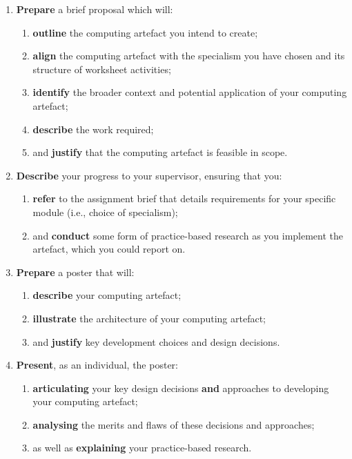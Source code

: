 \documentclass{../../fal_assignment}
\begin{document}
\begin{enumerate}[label=(\Alph*)]
	\item \textbf{Prepare} a brief proposal which will:
		\begin{enumerate}[label=(\roman*)]
			\item \textbf{outline} the computing artefact you intend to create;
			\item \textbf{align} the computing artefact with the specialism you have chosen and its structure of worksheet activities;
			\item \textbf{identify} the broader context and potential application of your computing artefact;
			\item \textbf{describe} the work required;
			\item and \textbf{justify} that the computing artefact is feasible in scope.
		\end{enumerate}
	\item \textbf{Describe} your progress to your supervisor, ensuring that you:
		\begin{enumerate}[label=(\roman*)]
			\item \textbf{refer} to the assignment brief that details requirements for your specific module (i.e., choice of specialism);
			\item and \textbf{conduct} some form of practice-based research as you implement the artefact, which you could report on.
		\end{enumerate}
	\item \textbf{Prepare} a poster that will:
		\begin{enumerate}[label=(\roman*)]
			\item \textbf{describe} your computing artefact;
			\item \textbf{illustrate} the architecture of your computing artefact;
			\item and \textbf{justify} key development choices and design decisions.
		\end{enumerate}
	\item \textbf{Present}, as an individual, the poster:
		\begin{enumerate}[label=(\roman*)]
			\item \textbf{articulating} your key design decisions \textbf{and} approaches to developing your computing artefact;
			\item \textbf{analysing} the merits and flaws of these decisions and approaches;
			\item as well as \textbf{explaining} your practice-based research.
		\end{enumerate}	
\end{enumerate}
\end{document}
